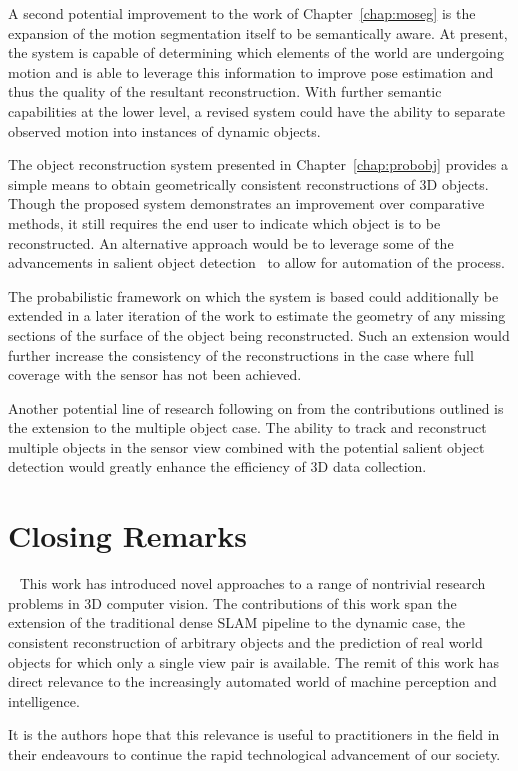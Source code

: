 A second potential improvement to the work of Chapter~\ref{chap:moseg} is the expansion of the 
motion segmentation itself to be semantically aware. At present, the system is capable of 
determining which elements of the world are undergoing motion and is able to leverage this 
information to improve pose estimation and thus the quality of the resultant reconstruction. 
With further semantic capabilities at the lower level, a revised system could have the ability 
to separate observed motion into instances of dynamic objects.

The object reconstruction system presented in Chapter~\ref{chap:probobj} provides a simple means 
to obtain geometrically consistent reconstructions of 3D objects. Though the proposed system
demonstrates an improvement over comparative methods, it still requires the end user to indicate 
which object is to be reconstructed. An alternative approach would be to leverage some of the 
advancements in salient object detection~\cite{SALIENT} to allow for automation of the process.

The probabilistic framework on which the system is based could additionally be extended in a later 
iteration of the work to estimate the geometry of any missing sections of the surface of the object 
being reconstructed. Such an extension would further increase the consistency of the reconstructions 
in the case where full coverage with the sensor has not been achieved.

Another potential line of research following on from the contributions outlined is the extension to 
the multiple object case. The ability to track and reconstruct multiple objects in the sensor view 
combined with the potential salient object detection would greatly enhance the efficiency of 3D data 
collection.

\section{Closing Remarks}
~\label{sec:discussion_conclusions}
This work has introduced novel approaches to a range of nontrivial research problems in 3D computer 
vision. The contributions of this work span the extension of the traditional dense SLAM pipeline to 
the dynamic case, the consistent reconstruction of arbitrary objects and the prediction of real world 
objects for which only a single view pair is available. The remit of this work has direct relevance to 
the increasingly automated world of machine perception and intelligence.

It is the authors hope that this relevance is useful to practitioners in the field in their endeavours 
to continue the rapid technological advancement of our society.